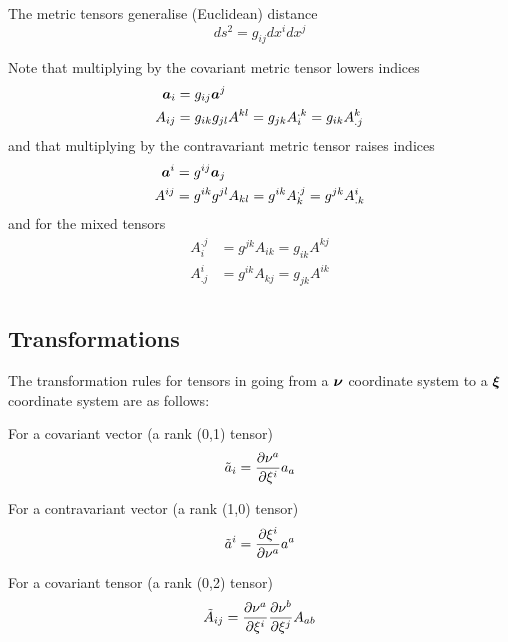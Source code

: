 The metric tensors generalise (Euclidean) distance \ie
\begin{equation}
  ds^{2}=g_{ij}dx^{i}dx^{j}
\end{equation}

Note that multiplying by the covariant metric tensor lowers indices \ie
\begin{equation}
  \begin{split}
    \vect{A}_{i} &= g_{ij}\vect{A}^{j} \\
    A_{ij} &= g_{ik}g_{jl}A^{kl} = g_{jk}A_{i}^{.k} = g_{ik}A^{k}_{.j} 
  \end{split}
\end{equation}
and that multiplying by the contravariant metric tensor raises indices \ie
\begin{equation}
  \begin{split}
  \vect{A}^{i} &=  g^{ij}\vect{A}_{j} \\
   A^{ij} &= g^{ik}g^{jl}A_{kl} = g^{ik}A_{k}^{.j} = g^{jk}A^{i}_{.k}
  \end{split}
\end{equation}
and for the mixed tensors
\begin{equation}
  \begin{split}
  A_{i}^{.j} &= g^{jk}A_{ik} = g_{ik}A^{kj} \\
  A^{i}_{.j} &= g^{ik}A_{kj} = g_{jk}A^{ik} \\
  \end{split}
\end{equation}

\subsection{Transformations}

The transformation rules for tensors in going from a $\vect{\nu}$ coordinate
system to a $\vect{\xi}$ coordinate system are as follows: 


For a covariant vector (a rank (0,1) tensor)
\begin{equation}
  {\tilde{a}}_{i}= \dfrac{\partial \nu^{a}}{\partial \xi^{i}} a_{a}
\end{equation}

For a contravariant vector (a rank (1,0) tensor)
\begin{equation}
  {\tilde{a}}^{i}= \dfrac{\partial \xi^{i}}{\partial \nu^{a}} a^{a}
\end{equation}

For a covariant tensor (a rank (0,2) tensor)
\begin{equation}
  {\tilde{A}}_{ij}= \dfrac{\partial \nu^{a}}{\partial \xi^{i}}  \dfrac{\partial \nu^{b}}{\partial \xi^{j}} A_{ab} 
\end{equation}

